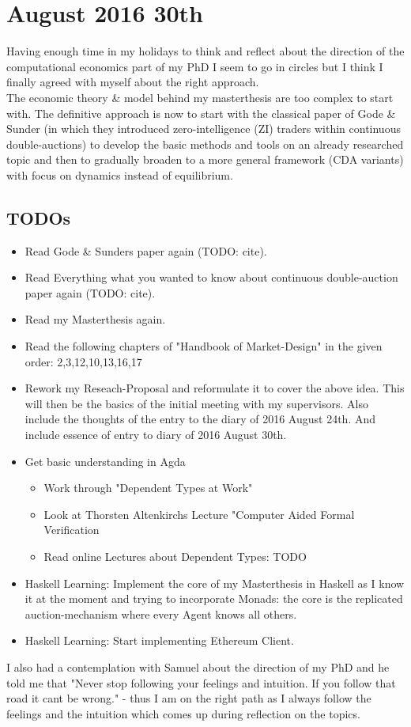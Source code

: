 \section*{August 2016 30th}
Having enough time in my holidays to think and reflect about the direction of the computational economics part of my PhD I seem to go in circles but I think I finally agreed with myself about the right approach. \\

The economic theory \& model behind my masterthesis are too complex to start with. The definitive approach is now to start with the classical paper of Gode \& Sunder (in which they introduced zero-intelligence (ZI) traders within continuous double-auctions) to develop the basic methods and tools on an already researched topic and then to gradually broaden to a more general framework (CDA variants) with focus on dynamics instead of equilibrium. \\

\subsection*{TODOs}
\begin{itemize}
\item Read Gode \& Sunders paper again (TODO: cite).
\item Read Everything what you wanted to know about continuous double-auction paper again (TODO: cite).
\item Read my Masterthesis again.
\item Read the following chapters of "Handbook of Market-Design" in the given order: 2,3,12,10,13,16,17
\item Rework my Reseach-Proposal and reformulate it to cover the above idea. 
This will then be the basics of the initial meeting with my supervisors. Also include the thoughts of the entry to the diary of 2016 August 24th. And include essence of entry to diary of 2016 August 30th.
\item Get basic understanding in Agda 
	\begin{itemize}
	\item Work through "Dependent Types at Work"
	\item Look at Thorsten Altenkirchs Lecture "Computer Aided Formal Verification
	\item Read online Lectures about Dependent Types: TODO
	\end{itemize}
\item Haskell Learning: Implement the core of my Masterthesis in Haskell as I know it at the moment and trying to incorporate Monads: the core is the replicated auction-mechanism where every Agent knows all others.
\item Haskell Learning: Start implementing Ethereum Client.
\end{itemize}

\bigskip

I also had a contemplation with Samuel about the direction of my PhD and he told me that "Never stop following your feelings and intuition. If you follow that road it cant be wrong." - thus I am on the right path as I always follow the feelings and the intuition which comes up during reflection on the topics.
